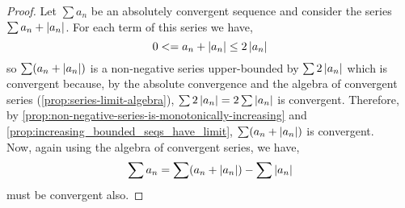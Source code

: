 \documentclass[../MathsNotesBase.tex]{subfiles}
\begin{document}
{		\bigskip
		\begin{proof}
			
			Let ${ \sum a_n }$ be an absolutely convergent sequence and consider the series ${ \sum a_n + \left\lvert a_n\right\rvert }$. For each term of this series we have,
			\[ 0 <= a_n + \left\lvert a_n\right\rvert \leq 2\left\lvert a_n\right\rvert \] 
			so ${ \sum (a_n + \left\lvert a_n\right\rvert) }$ is a non-negative series upper-bounded by ${ \sum 2\left\lvert a_n\right\rvert }$ which is convergent because, by the absolute convergence and the algebra of convergent series (\autoref{prop:series-limit-algebra}), ${ \sum 2\left\lvert a_n\right\rvert = 2 \sum \left\lvert a_n\right\rvert }$ is convergent. Therefore, by \autoref{prop:non-negative-series-is-monotonically-increasing} and \autoref{prop:increasing_bounded_seqs_have_limit}, ${ \sum (a_n + \left\lvert a_n\right\rvert) }$ is convergent.\\
			
			Now, again using the algebra of convergent series, we have, 
			\[ \sum a_n = \sum (a_n + \left\lvert a_n\right\rvert) - \sum \left\lvert a_n\right\rvert \]
			must be convergent also.
		\end{proof}
		
}
\end{document}
